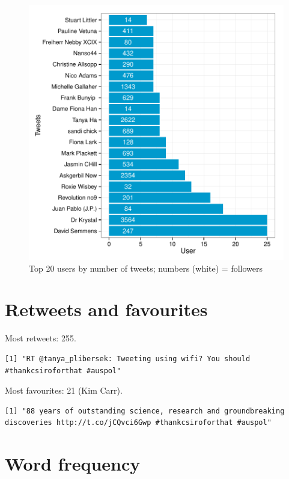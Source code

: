 \documentclass[a4paper,10pt]{article}
\begin{document}
\begin{figure}[h]
\begin{center}
\includegraphics{thankCSIROjson-003}
\caption{Top 20 users by number of tweets; numbers (white) = followers}
\end{center}
\end{figure}


\section{Retweets and favourites}
Most retweets: 255.

\begin{lstlisting}
[1] "RT @tanya_plibersek: Tweeting using wifi? You should #thankcsiroforthat #auspol"\end{lstlisting}


\noindent Most favourites: 21 (Kim Carr).

\begin{lstlisting}
[1] "88 years of outstanding science, research and groundbreaking discoveries http://t.co/jCQvci6Gwp #thankcsiroforthat #auspol"\end{lstlisting}

\newpage

\section{Word frequency}
\end{document}
